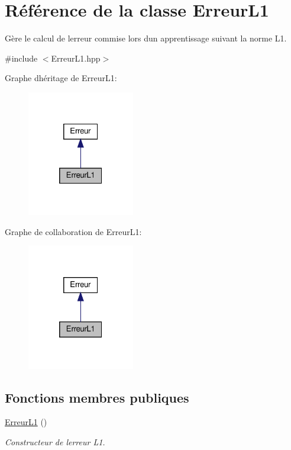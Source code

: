 \hypertarget{classErreurL1}{}\section{Référence de la classe Erreur\+L1}
\label{classErreurL1}


Gère le calcul de l\textquotesingle{}erreur commise lors d\textquotesingle{}un apprentissage suivant la norme L1.  




{\ttfamily \#include $<$Erreur\+L1.\+hpp$>$}



Graphe d\textquotesingle{}héritage de Erreur\+L1\+:
\nopagebreak
\begin{figure}[H]
\begin{center}
\leavevmode
\includegraphics[width=133pt]{classErreurL1__inherit__graph}
\end{center}
\end{figure}


Graphe de collaboration de Erreur\+L1\+:
\nopagebreak
\begin{figure}[H]
\begin{center}
\leavevmode
\includegraphics[width=133pt]{classErreurL1__coll__graph}
\end{center}
\end{figure}
\subsection*{Fonctions membres publiques}
\begin{DoxyCompactItemize}
\item 
\mbox{\label{classErreurL1_ac22fa445742caeefafa848de6db282bf}} 
\hyperlink{classErreurL1_ac22fa445742caeefafa848de6db282bf}{Erreur\+L1} ()
\begin{DoxyCompactList}\small\item\em Constructeur de l\textquotesingle{}erreur L1. \end{DoxyCompactList}\end{DoxyCompactItemize}


